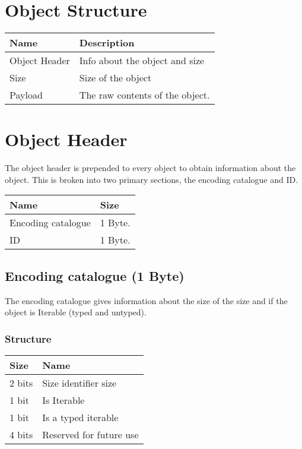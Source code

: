 \documentclass[11pt]{article}
\begin{document}
\section{Object Structure}
\begin{center}
  \begin{tabular}{ |l|l| }
    \hline
    \textbf{Name} & \textbf{Description}            \\
    \hline
    Object Header & Info about the object and size  \\
    Size          & Size of the object              \\
    Payload       & The raw contents of the object. \\
    \hline
  \end{tabular}
\end{center}

\section{Object Header}
The object header is prepended to every object to obtain information about the object. This is broken into two primary sections, the encoding catalogue and ID.

\begin{center}
  \begin{tabular}{ |l|l| }
    \hline
    \textbf{Name}      & \textbf{Size} \\
    \hline
    Encoding catalogue & 1 Byte.       \\
    ID                 & 1 Byte.       \\
    \hline
  \end{tabular}
\end{center}


\subsection{Encoding catalogue (1 Byte)}
The encoding catalogue gives information about the size of the size and if the object is Iterable (typed and untyped).

\subsubsection{Structure}
\begin{center}
  \begin{tabular}{ |l|l| }
    \hline
    \textbf{Size} & \textbf{Name}           \\
    \hline
    2 bits        & Size identifier size    \\
    1 bit         & Is Iterable             \\
    1 bit         & Is a typed iterable     \\
    4 bits        & Reserved for future use \\
    \hline
  \end{tabular}
\end{center}
\end{document}
